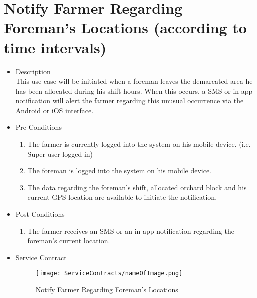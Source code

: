 \documentclass[11pt,fleqn]{book} %
\begin{document}
\section{Notify Farmer Regarding Foreman’s Locations (according to time intervals)}
\begin{itemize}
	\item Description\\
	This use case will be initiated when a foreman leaves the demarcated area he has been allocated during his shift hours. When this occurs, a SMS or in-app notification will alert the farmer regarding this unusual occurrence via the Android or iOS interface.
	\item Pre-Conditions
	\begin{enumerate}
		\item The farmer is currently logged into the system on his mobile device. (i.e. Super user logged in)
		\item The foreman is logged into the system on his mobile device.
		\item The data regarding the foreman’s shift, allocated orchard block and his current GPS location are available to initiate the notification.						
	\end{enumerate}
	\item Post-Conditions
	\begin{enumerate}
		\item The farmer receives an SMS or an in-app notification regarding the foreman’s current location.
	\end{enumerate}
	\item Service Contract
	\begin{figure}
		\texttt{[image: ServiceContracts/nameOfImage.png]}
		\caption{Notify Farmer Regarding Foreman’s Locations}
	\end{figure}
\end{itemize}
\end{document}
